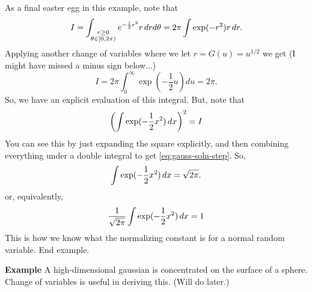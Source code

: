 As a final easter egg in this example, note that 
\begin{align}
I = \int_{\substack{r \geq 0\\ \theta \in [0, 2\pi)}} e^{-\frac{1}{2}r^2} r \, dr d\theta = 2\pi \int \exp(-r^2) r\, dr. 
\end{align}
Applying another change of variables where we let $r = G(u) = u^{1/2}$ we get (I might have missed a minus sign below...)
$$
I = 2\pi \int_0^\infty \exp(-\frac{1}{2}u) du = 2\pi. 
$$
So, we have an explicit evaluation of this integral. But, note that
$$
\left(\int \exp(-\frac{1}{2}x^2) \, dx\right)^2 = I
$$
You can see this by just expanding the square explicitly, and then combining everything under a double integral to get \eqref{eq:gauss-soln-step}. So, 
$$
\int \exp(-\frac{1}{2}x^2)\, dx = \sqrt{2\pi}. 
$$
or, equivalently, 
$$
\frac{1}{\sqrt{2\pi}}\int \exp(-\frac{1}{2}x^2)\, dx = 1
$$
This is how we know what the normalizing constant is for a normal random variable. 
End example. 

\vspace{1em}
\noindent
\textbf{Example} A high-dimensional gaussian is concentrated on the surface of a sphere. Change of variables is useful in deriving this. (Will do later.) 

